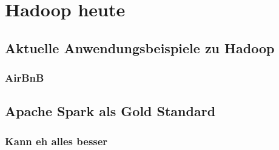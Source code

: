 \chapter{Hadoop heute}
\section{Aktuelle Anwendungsbeispiele zu Hadoop}
\subsection{AirBnB}
\section{Apache Spark als Gold Standard}
\subsection{Kann eh alles besser}